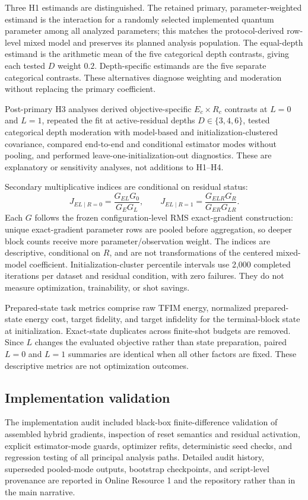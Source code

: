 \documentclass[pdflatex,sn-basic,Numbered]{sn-jnl}
\begin{document}
Three H1 estimands are distinguished. The retained primary, parameter-weighted estimand is the interaction for a randomly selected implemented quantum parameter among all analyzed parameters; this matches the protocol-derived row-level mixed model and preserves its planned analysis population. The equal-depth estimand is the arithmetic mean of the five categorical depth contrasts, giving each tested $D$ weight $0.2$. Depth-specific estimands are the five separate categorical contrasts. These alternatives diagnose weighting and moderation without replacing the primary coefficient.

Post-primary H3 analyses derived objective-specific $E_c\times R_c$ contrasts at $L=0$ and $L=1$, repeated the fit at active-residual depths $D\in\{3,4,6\}$, tested categorical depth moderation with model-based and initialization-clustered covariance, compared end-to-end and conditional estimator modes without pooling, and performed leave-one-initialization-out diagnostics. These are explanatory or sensitivity analyses, not additions to H1--H4.

Secondary multiplicative indices are conditional on residual status:
\[
J_{EL\mid R=0}=\frac{G_{EL}G_0}{G_EG_L},\qquad
J_{EL\mid R=1}=\frac{G_{ELR}G_R}{G_{ER}G_{LR}}.
\]
Each $G$ follows the frozen configuration-level RMS exact-gradient construction: unique exact-gradient parameter rows are pooled before aggregation, so deeper block counts receive more parameter/observation weight. The indices are descriptive, conditional on $R$, and are not transformations of the centered mixed-model coefficient. Initialization-cluster percentile intervals use 2,000 completed iterations per dataset and residual condition, with zero failures. They do not measure optimization, trainability, or shot savings.

Prepared-state task metrics comprise raw TFIM energy, normalized prepared-state energy cost, target fidelity, and target infidelity for the terminal-block state at initialization. Exact-state duplicates across finite-shot budgets are removed. Since $L$ changes the evaluated objective rather than state preparation, paired $L=0$ and $L=1$ summaries are identical when all other factors are fixed. These descriptive metrics are not optimization outcomes.

\subsection{Implementation validation}

The implementation audit included black-box finite-difference validation of assembled hybrid gradients, inspection of reset semantics and residual activation, explicit estimator-mode guards, optimizer refits, deterministic seed checks, and regression testing of all principal analysis paths. Detailed audit history, superseded pooled-mode outputs, bootstrap checkpoints, and script-level provenance are reported in Online Resource 1 and the repository rather than in the main narrative.
\end{document}

